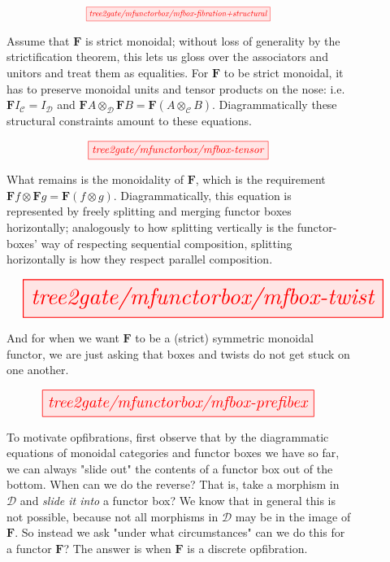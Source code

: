 \begin{figure}[h!]
\[\resizebox{0.5\textwidth}{!}{\tikzfig{tree2gate/mfunctorbox/mfbox-fibration+structural}}\]
\caption{Assume that $\mathbf{F}$ is strict monoidal; without loss of generality by the strictification theorem, this lets us gloss over the associators and unitors and treat them as equalities. For $\mathbf{F}$ to be strict monoidal, it has to preserve monoidal units and tensor products on the nose: i.e. $\mathbf{F}I_\mathcal{C} = I_\mathcal{D}$ and $\mathbf{F}A \otimes_\mathcal{D} \mathbf{F}B = \mathbf{F}(A \otimes_\mathcal{C} B)$. Diagrammatically these structural constraints amount to these equations.}
\end{figure}

\begin{figure}[h!]
\[\resizebox{0.5\textwidth}{!}{\tikzfig{tree2gate/mfunctorbox/mfbox-tensor}}\]
\caption{What remains is the monoidality of $\mathbf{F}$, which is the requirement $\mathbf{F}f \otimes \mathbf{F}g = \mathbf{F}(f \otimes g)$. Diagrammatically, this equation is represented by freely splitting and merging functor boxes horizontally; analogously to how splitting vertically is the functor-boxes' way of respecting sequential composition, splitting horizontally is how they respect parallel composition.}
\end{figure}

\begin{figure}[h!]
\[\resizebox{\textwidth}{!}{\tikzfig{tree2gate/mfunctorbox/mfbox-twist}}\]
\caption{And for when we want $\mathbf{F}$ to be a (strict) symmetric monoidal functor, we are just asking that boxes and twists do not get stuck on one another.}
\end{figure}

\begin{figure}[h!]
\[\resizebox{0.75\textwidth}{!}{\tikzfig{tree2gate/mfunctorbox/mfbox-prefibex}}\]
\caption{To motivate opfibrations, first observe that by the diagrammatic equations of monoidal categories and functor boxes we have so far, we can always "slide out" the contents of a functor box out of the bottom. When can we do the reverse? That is, take a morphism in $\mathcal{D}$ and \emph{slide it into} a functor box? We know that in general this is not possible, because not all morphisms in $\mathcal{D}$ may be in the image of $\mathbf{F}$. So instead we ask "under what circumstances" can we do this for a functor $\mathbf{F}$? The answer is when $\mathbf{F}$ is a discrete opfibration.}
\end{figure}

